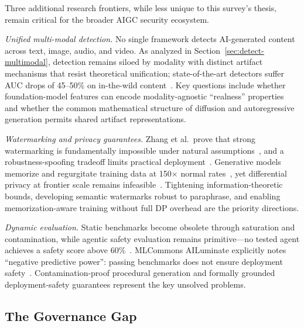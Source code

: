 Three additional research frontiers, while less unique to this survey's thesis, remain critical for the broader AIGC security ecosystem.

\emph{Unified multi-modal detection.} No single framework detects AI-generated content across text, image, audio, and video. As analyzed in Section~\ref{sec:detect-multimodal}, detection remains siloed by modality with distinct artifact mechanisms that resist theoretical unification; state-of-the-art detectors suffer AUC drops of 45--50\% on in-the-wild content~\cite{chandra2025deepfakeeval}. Key questions include whether foundation-model features can encode modality-agnostic ``realness'' properties~\cite{ojha2023univfd} and whether the common mathematical structure of diffusion and autoregressive generation permits shared artifact representations.

\emph{Watermarking and privacy guarantees.} Zhang et al.\ prove that strong watermarking is fundamentally impossible under natural assumptions~\cite{zhang2024impossibility}, and a robustness-spoofing tradeoff limits practical deployment~\cite{pang2024nofree}. Generative models memorize and regurgitate training data at 150$\times$ normal rates~\cite{nasr2025extraction}, yet differential privacy at frontier scale remains infeasible~\cite{tramer2024dpposition}. Tightening information-theoretic bounds, developing semantic watermarks robust to paraphrase, and enabling memorization-aware training without full DP overhead are the priority directions.

\emph{Dynamic evaluation.} Static benchmarks become obsolete through saturation and contamination, while agentic safety evaluation remains primitive---no tested agent achieves a safety score above 60\%~\cite{zhang2024agentsafetybench}. MLCommons AILuminate explicitly notes ``negative predictive power'': passing benchmarks does not ensure deployment safety~\cite{ghosh2024ailuminate}. Contamination-proof procedural generation and formally grounded deployment-safety guarantees represent the key unsolved problems.


\subsection{The Governance Gap}
\label{sec:governance}

